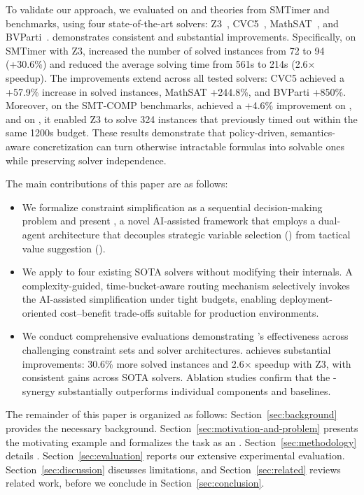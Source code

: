 To validate our approach, we evaluated \tool on \QFLIA{} and \QFNIA{} theories from SMTimer and \SMTCOMP{} benchmarks, using four state-of-the-art solvers: Z3~\cite{demoura2008z3}, CVC5~\cite{cvc5}, MathSAT~\cite{mathsat5}, and BVParti~\cite{bvparti2025}. \tool demonstrates consistent and substantial improvements. Specifically, on SMTimer with Z3, \tool increased the number of solved instances from 72 to 94 (+30.6\%) and reduced the average solving time from 561s to 214s (2.6$\times$ speedup). The improvements extend across all tested solvers: CVC5 achieved a +57.9\% increase in solved instances, MathSAT +244.8\%, and BVParti +850\%. 
Moreover, on the SMT-COMP benchmarks, \tool achieved a +4.6\% improvement on \QFLIA{}, and on \QFNIA{}, it enabled Z3 to solve 324 instances that previously timed out within the same 1200s budget. 
These results demonstrate that policy-driven, semantics-aware concretization can turn otherwise intractable formulas into solvable ones while preserving solver independence.

The main contributions of this paper are as follows:
\begin{itemize}
  \item We formalize \SMT{} constraint simplification as a sequential decision-making problem and present \tool, a novel AI-assisted framework that employs a dual-agent architecture that decouples strategic variable selection (\RL{}) from tactical value suggestion (\LLM{}).

  \item We apply \tool to four existing SOTA solvers without modifying their internals. A complexity-guided, time-bucket-aware routing mechanism selectively invokes the AI-assisted simplification under tight budgets, enabling deployment-oriented cost–benefit trade-offs suitable for production environments.

  \item We conduct comprehensive evaluations demonstrating \tool's effectiveness across challenging constraint sets and solver architectures. \tool achieves substantial improvements: 30.6\% more solved instances and 2.6$\times$ speedup with Z3, with consistent gains across SOTA solvers. Ablation studies confirm that the \RL{}-\LLM{} synergy substantially outperforms individual components and baselines.
\end{itemize}

The remainder of this paper is organized as follows: Section~\ref{sec:background} provides the necessary background. Section~\ref{sec:motivation-and-problem} presents the motivating example and formalizes the task as an \MDP{}. Section~\ref{sec:methodology} details \tool. Section~\ref{sec:evaluation} reports our extensive experimental evaluation. Section~\ref{sec:discussion} discusses limitations, and Section~\ref{sec:related} reviews related work, before we conclude in Section~\ref{sec:conclusion}. 
